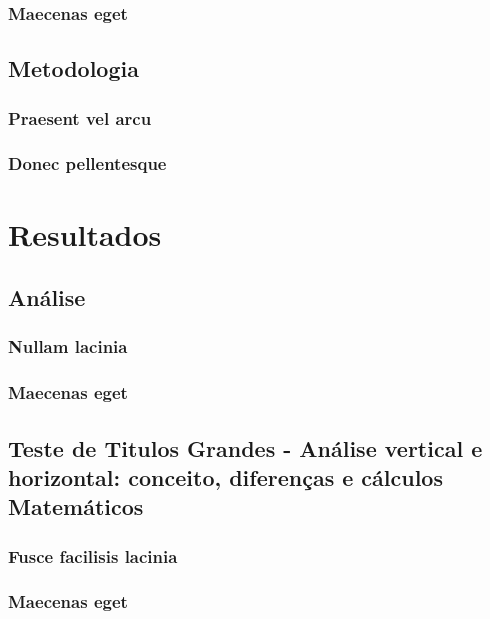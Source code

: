 \documentclass[12pt,
    a4paper,
    oneside,
    oldfontcommands]
{memoir}
\begin{document}
\section{Maecenas eget}
\lipsum[55]

\chapter{Metodologia}
\section{Praesent vel arcu}
\lipsum[5]

\section{Donec pellentesque}
\lipsum[55]

\part{Resultados}

\chapter{Análise}
\section{Nullam lacinia}
\lipsum[5]

\section{Maecenas eget}
\lipsum[55]

\chapter{Teste de Titulos Grandes - Análise vertical e horizontal: conceito, diferenças e cálculos Matemáticos}
\section{Fusce facilisis lacinia}
\lipsum[5]

\section{Maecenas eget}
\lipsum[55]


\end{document}
